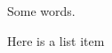 \documentclass{article}
\newenvironment{sample}{
	\begin{list}{}{}
	\setlength{\labelwidth}{20mm}
}{ 
	\end{list}
}
\begin{document}
	Some words.
\begin{sample}
	\item Here is a list item
\end{sample}
\end{document}
